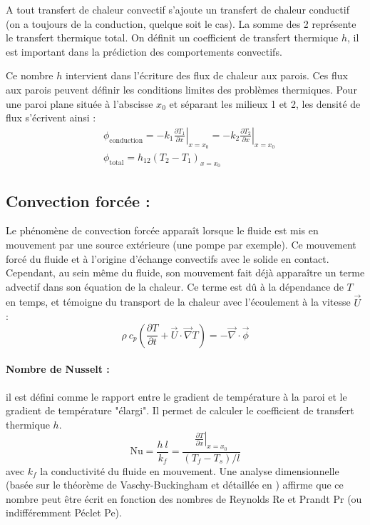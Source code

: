 A tout transfert de chaleur convectif s'ajoute un transfert de chaleur conductif (on a toujours de la conduction, quelque soit le cas). La somme des 2 représente le transfert thermique total. On définit un coefficient de transfert thermique $h$, il est important dans la prédiction des comportements convectifs.

Ce nombre $h$ intervient dans l'écriture des flux de chaleur aux parois. Ces flux aux parois peuvent définir les conditions limites des problèmes thermiques. Pour une paroi plane située à l'abscisse $x_0$ et séparant les milieux 1 et 2, les densité de flux s'écrivent ainsi :
%
\begin{align}[left=\empheqlbrace]
    &\phi_{\text{conduction}}
    = - k_1 \left. \frac{\partial{T_1}}{\partial{x}} \right|_{x=x_0}
    = - k_2 \left. \frac{\partial{T_2}}{\partial{x}} \right|_{x=x_0} \\
    &\phi_{\text{total}}
    = h_{12} \left( T_2 - T_1 \right)_{x=x_0}
    \label{eq:fluxth}
\end{align}


\subsection{Convection forcée :}
Le phénomène de convection forcée apparaît lorsque le fluide est mis en mouvement par une source extérieure (une pompe par exemple). Ce mouvement forcé du fluide et à l'origine d'échange convectifs avec le solide en contact. Cependant, au sein même du fluide, son mouvement fait déjà apparaître un terme advectif dans son équation de la chaleur. Ce terme est dû à la dépendance de $T$ en temps, et témoigne du transport de la chaleur avec l'écoulement à la vitesse $\vec{U}$ :
%
\begin{equation}
    \rho~c_{p} \left( \frac{\partial T}{\partial t}
    + \vec{U} \cdot \vec{\nabla} T \right)
    = - \vec{\nabla} \cdot \vec{\phi}
\end{equation}

\paragraph{Nombre de Nusselt :}il est défini comme le rapport entre le gradient de température à la paroi et le gradient de température "élargi". Il permet de calculer le coefficient de transfert thermique $h$.
%
\begin{equation}
    \mathrm{Nu} = \frac{h~l}{k_f}
       = \frac{\left. \frac{\partial{T}}{\partial{x}} \right|_{x=x_0}}
              {\left( T_f - T_s \right)/l}
\end{equation}
%
avec $k_f$ la conductivité du fluide en mouvement. Une analyse dimensionnelle (basée sur le théorème de Vaschy-Buckingham et détaillée en \cite{battaglia2010introduction}) affirme que ce nombre peut être écrit en fonction des nombres de Reynolds Re et Prandt Pr (ou indifféremment Péclet Pe).

